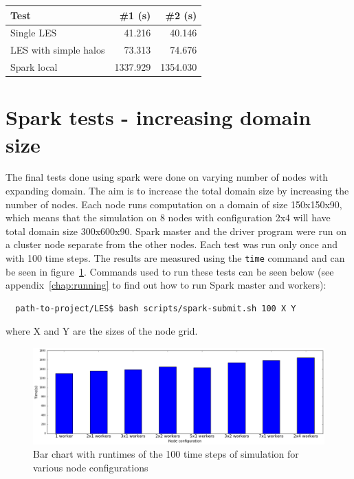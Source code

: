 \documentclass{l4proj}
\begin{document}
\begin{center}
  \begin{tabular}{ | l | r | r | }
      \hline
      Test & \#1 (s) & \#2 (s) \\
      \hline
      Single LES & 41.216 & 40.146 \\
      LES with simple halos & 73.313 & 74.676 \\
      Spark local & 1337.929 & 1354.030 \\
      \hline
  \end{tabular}
  \label{tab:baseline_times}
\end{center}

\section{Spark tests - increasing domain size}

The final tests done using spark were done on varying number of nodes with expanding domain.
The aim is to increase the total domain size by increasing the number of nodes.
Each node runs computation on a domain of size 150x150x90, which means that the simulation
on 8 nodes with configuration 2x4 will have total domain size 300x600x90. Spark master
and the driver program were run on a cluster node separate from the other nodes.
Each test was run only once and with 100 time steps. The results are measured using the \texttt{time} command
and can be seen in figure~\ref{fig:eval}. Commands used to run these tests can be seen below
(see appendix~\ref{chap:running} to find out how to run Spark master and workers):
\begin{verbatim}
  path-to-project/LES$ bash scripts/spark-submit.sh 100 X Y
\end{verbatim}
where X and Y are the sizes of the node grid.

\begin{figure}
\centering
\includegraphics[width=1\textwidth]{images/evaluation.png}
\caption{Bar chart with runtimes of the 100 time steps of simulation for various node configurations}
\label{fig:eval}
\end{figure}
\end{document}
